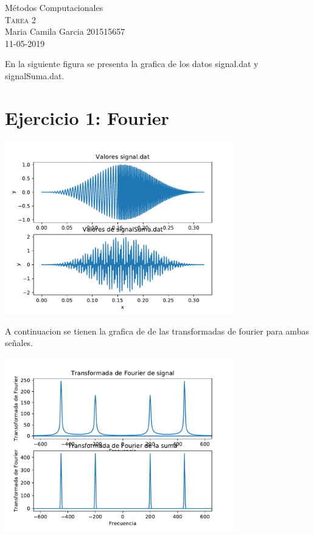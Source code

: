 \documentclass[11pt,letterpaper]{exam}
\begin{document}
\begin{center}
{\Large Métodos Computacionales} \\
\textsc{Tarea 2}\\
Maria Camila Garcia 201515657\\
11-05-2019\\
\end{center}

En la siguiente figura se presenta la grafica de los datos signal.dat y signalSuma.dat.

\noindent
\section{Ejercicio 1: Fourier}
\begin{center}
\includegraphics[width=10cm]{GarciaCamila_SubplotsGraficas.pdf}
\end{center}

A continuacion se tienen la grafica de de las transformadas de fourier para ambas señales. 

\begin{center}
\includegraphics[width=10cm]{GarciaCamila_Transformadas.pdf}
\end{center}
\end{document}
